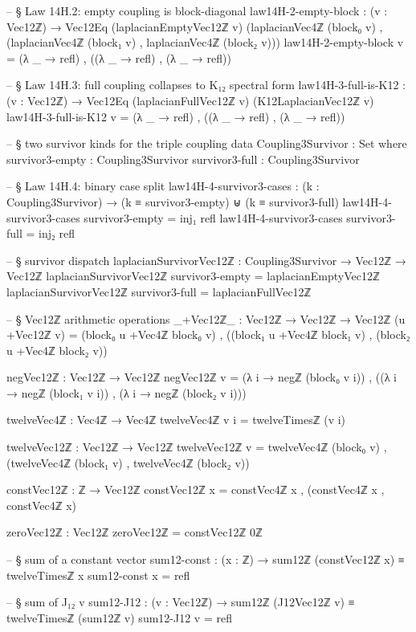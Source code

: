 \documentclass[11pt,a4paper]{book}
\begin{document}
\begin{code}
-- § Law 14H.2: empty coupling is block-diagonal
law14H-2-empty-block : (v : Vec12ℤ) →
  Vec12Eq (laplacianEmptyVec12ℤ v)
         (laplacianVec4ℤ (block₀ v) , (laplacianVec4ℤ (block₁ v) , laplacianVec4ℤ (block₂ v)))
law14H-2-empty-block v = (λ _ → refl) , ((λ _ → refl) , (λ _ → refl))

-- § Law 14H.3: full coupling collapses to K₁₂ spectral form
law14H-3-full-is-K12 : (v : Vec12ℤ) → Vec12Eq (laplacianFullVec12ℤ v) (K12LaplacianVec12ℤ v)
law14H-3-full-is-K12 v = (λ _ → refl) , ((λ _ → refl) , (λ _ → refl))

-- § two survivor kinds for the triple coupling
data Coupling3Survivor : Set where
  survivor3-empty : Coupling3Survivor
  survivor3-full  : Coupling3Survivor

-- § Law 14H.4: binary case split
law14H-4-survivor3-cases : (k : Coupling3Survivor) → (k ≡ survivor3-empty) ⊎ (k ≡ survivor3-full)
law14H-4-survivor3-cases survivor3-empty = inj₁ refl
law14H-4-survivor3-cases survivor3-full  = inj₂ refl

-- § survivor dispatch
laplacianSurvivorVec12ℤ : Coupling3Survivor → Vec12ℤ → Vec12ℤ
laplacianSurvivorVec12ℤ survivor3-empty = laplacianEmptyVec12ℤ
laplacianSurvivorVec12ℤ survivor3-full  = laplacianFullVec12ℤ

-- § Vec12ℤ arithmetic operations
_+Vec12ℤ_ : Vec12ℤ → Vec12ℤ → Vec12ℤ
(u +Vec12ℤ v) =
  (block₀ u +Vec4ℤ block₀ v) ,
  ((block₁ u +Vec4ℤ block₁ v) ,
   (block₂ u +Vec4ℤ block₂ v))

negVec12ℤ : Vec12ℤ → Vec12ℤ
negVec12ℤ v =
  (λ i → negℤ (block₀ v i)) ,
  ((λ i → negℤ (block₁ v i)) ,
   (λ i → negℤ (block₂ v i)))

twelveVec4ℤ : Vec4ℤ → Vec4ℤ
twelveVec4ℤ v i = twelveTimesℤ (v i)

twelveVec12ℤ : Vec12ℤ → Vec12ℤ
twelveVec12ℤ v = twelveVec4ℤ (block₀ v) , (twelveVec4ℤ (block₁ v) , twelveVec4ℤ (block₂ v))

constVec12ℤ : ℤ → Vec12ℤ
constVec12ℤ x = constVec4ℤ x , (constVec4ℤ x , constVec4ℤ x)

zeroVec12ℤ : Vec12ℤ
zeroVec12ℤ = constVec12ℤ 0ℤ

-- § sum of a constant vector
sum12-const : (x : ℤ) → sum12ℤ (constVec12ℤ x) ≡ twelveTimesℤ x
sum12-const x = refl

-- § sum of J₁₂ v
sum12-J12 : (v : Vec12ℤ) → sum12ℤ (J12Vec12ℤ v) ≡ twelveTimesℤ (sum12ℤ v)
sum12-J12 v = refl
\end{code}
\end{document}
